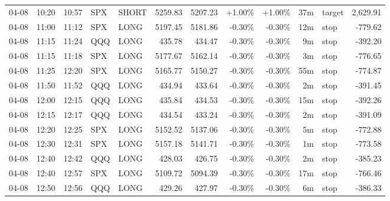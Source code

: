 \documentclass[11pt,a4paper,twoside]{article}
\begin{document}
\begin{center}
\begin{longtable}{>{\color{txtmain}}l l l l l r r r r r >{\color{txtmain}}l r}
04-08 & 10:20 & 10:57 & SPX & SHORT & 5259.83 & 5207.23 & \textcolor{wingreen}{+1.00\%} & \textcolor{wingreen}{+1.00\%} & 37m & target & \textcolor{wingreen}{2,629.91} \\
04-08 & 11:00 & 11:12 & SPX & LONG & 5197.45 & 5181.86 & \textcolor{lossred}{-0.30\%} & \textcolor{lossred}{-0.30\%} & 12m & stop & \textcolor{lossred}{-779.62} \\
04-08 & 11:15 & 11:24 & QQQ & LONG & 435.78 & 434.47 & \textcolor{lossred}{-0.30\%} & \textcolor{lossred}{-0.30\%} & 9m & stop & \textcolor{lossred}{-392.20} \\
04-08 & 11:15 & 11:18 & SPX & LONG & 5177.67 & 5162.14 & \textcolor{lossred}{-0.30\%} & \textcolor{lossred}{-0.30\%} & 3m & stop & \textcolor{lossred}{-776.65} \\
04-08 & 11:25 & 12:20 & SPX & LONG & 5165.77 & 5150.27 & \textcolor{lossred}{-0.30\%} & \textcolor{lossred}{-0.30\%} & 55m & stop & \textcolor{lossred}{-774.87} \\
04-08 & 11:50 & 11:52 & QQQ & LONG & 434.94 & 433.64 & \textcolor{lossred}{-0.30\%} & \textcolor{lossred}{-0.30\%} & 2m & stop & \textcolor{lossred}{-391.45} \\
04-08 & 12:00 & 12:15 & QQQ & LONG & 435.84 & 434.53 & \textcolor{lossred}{-0.30\%} & \textcolor{lossred}{-0.30\%} & 15m & stop & \textcolor{lossred}{-392.26} \\
04-08 & 12:15 & 12:17 & QQQ & LONG & 434.54 & 433.24 & \textcolor{lossred}{-0.30\%} & \textcolor{lossred}{-0.30\%} & 2m & stop & \textcolor{lossred}{-391.09} \\
04-08 & 12:20 & 12:25 & SPX & LONG & 5152.52 & 5137.06 & \textcolor{lossred}{-0.30\%} & \textcolor{lossred}{-0.30\%} & 5m & stop & \textcolor{lossred}{-772.88} \\
04-08 & 12:30 & 12:31 & SPX & LONG & 5157.18 & 5141.71 & \textcolor{lossred}{-0.30\%} & \textcolor{lossred}{-0.30\%} & 1m & stop & \textcolor{lossred}{-773.58} \\
04-08 & 12:40 & 12:42 & QQQ & LONG & 428.03 & 426.75 & \textcolor{lossred}{-0.30\%} & \textcolor{lossred}{-0.30\%} & 2m & stop & \textcolor{lossred}{-385.23} \\
04-08 & 12:40 & 12:57 & SPX & LONG & 5109.72 & 5094.39 & \textcolor{lossred}{-0.30\%} & \textcolor{lossred}{-0.30\%} & 17m & stop & \textcolor{lossred}{-766.46} \\
04-08 & 12:50 & 12:56 & QQQ & LONG & 429.26 & 427.97 & \textcolor{lossred}{-0.30\%} & \textcolor{lossred}{-0.30\%} & 6m & stop & \textcolor{lossred}{-386.33} \\

\end{longtable}
\end{center}
\end{document}
